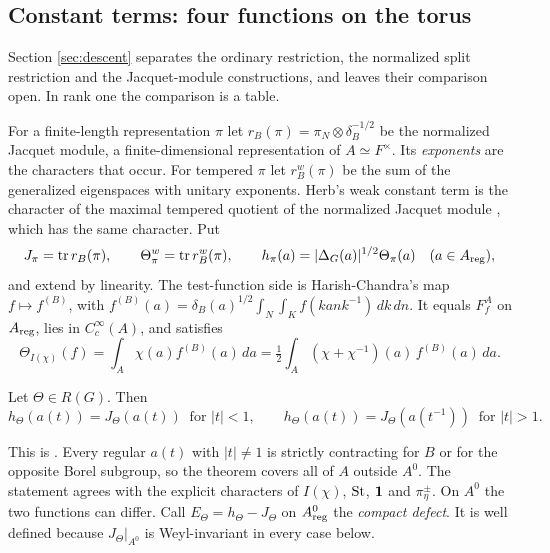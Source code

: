\subsection{Constant terms: four functions on the torus}\label{sub:four}
Section \ref{sec:descent} separates the ordinary restriction, the normalized split restriction and the Jacquet-module constructions, and leaves their comparison open. In rank one the comparison is a table.

For a finite-length representation $\pi$ let $r_B(\pi)=\pi_N\otimes\delta_B^{-1/2}$ be the normalized Jacquet module, a finite-dimensional representation of $A\simeq F^\times$. Its \emph{exponents} are the characters that occur. For tempered $\pi$ let $r_B^w(\pi)$ be the sum of the generalized eigenspaces with unitary exponents. Herb's weak constant term is the character of the maximal tempered quotient of the normalized Jacquet module \cite[Section 2]{He94}, which has the same character. Put
\[
J_\pi=\operatorname{tr} r_B(\pi),\qquad \Theta_\pi^w=\operatorname{tr} r_B^w(\pi),\qquad h_\pi(a)=|\Delta_G(a)|^{1/2}\Theta_\pi(a)\quad(a\in A_{\rm reg}),
\]
and extend by linearity. The test-function side is Harish-Chandra's map $f\mapsto f^{(B)}$, with $f^{(B)}(a)=\delta_B(a)^{1/2}\int_N\int_K f(kank^{-1})\,dk\,dn$. It equals $F_f^A$ on $A_{\rm reg}$, lies in $C_c^\infty(A)$, and satisfies
\begin{equation}\label{eq:adj}
\Theta_{I(\chi)}(f)=\int_A\chi(a)f^{(B)}(a)\,da=\tfrac12\int_A(\chi+\chi^{-1})(a)\,f^{(B)}(a)\,da .
\end{equation}

\begin{proposition}\label{prop:cass}
Let $\Theta\in R(G)$. Then\[h_\Theta(a(t))=J_\Theta(a(t))\ \text{ for }|t|<1,\qquad h_\Theta(a(t))=J_\Theta(a(t^{-1}))\ \text{ for }|t|>1 .\]
\end{proposition}
This is \cite{Ca77}. Every regular $a(t)$ with $|t|\ne1$ is strictly contracting for $B$ or for the opposite Borel subgroup, so the theorem covers all of $A$ outside $A^0$. The statement agrees with the explicit characters of $I(\chi)$, $\operatorname{St}$, $\mathbf 1$ and $\pi_\eta^\pm$. On $A^0$ the two functions can differ. Call $E_\Theta=h_\Theta-J_\Theta$ on $A^0_{\rm reg}$ the \emph{compact defect}. It is well defined because $J_\Theta|_{A^0}$ is Weyl-invariant in every case below.

